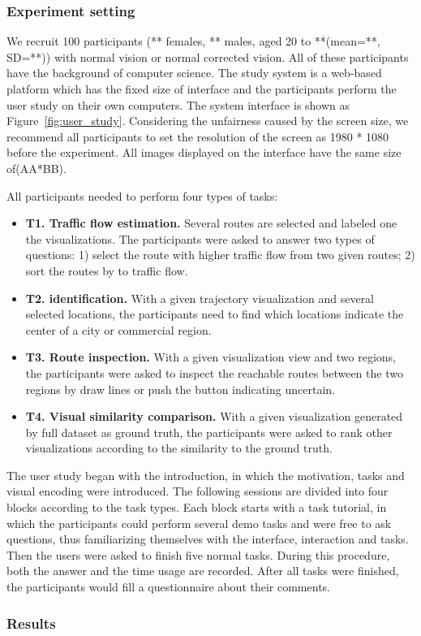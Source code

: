 \subsubsection{Experiment setting}

We recruit 100 participants (** females, ** males, aged 20 to **(mean=**, SD=**)) with normal vision or normal corrected vision. All of these participants have the background of computer science. 
The study system is a web-based platform which has the fixed size of interface and the participants perform the user study on their own  computers.  The system interface is shown as Figure~\ref{fig:user_study}. Considering the unfairness caused by the screen size, we recommend all participants to set the resolution of the screen as 1980 * 1080 before the experiment. All images displayed on the interface have the same size of(AA*BB).  

All participants needed to perform four types of tasks:
\begin{itemize}[noitemsep]
	\item \textbf{T1. Traffic flow estimation.} Several routes are selected and labeled one the visualizations. The participants were asked to answer two types of questions: 1) select the route with higher traffic flow from two given routes; 2) sort the routes by to traffic flow.
	\item \textbf{T2.  identification.} With a given trajectory visualization and several selected locations, the participants need to find which locations indicate the center of a city or commercial region. 
	\item \textbf{T3. Route inspection.} With a given visualization view and two regions, the participants were asked to inspect the reachable routes between the two regions by draw lines or push the button indicating uncertain.
	\item \textbf{T4. Visual similarity comparison.} With a given visualization generated by full dataset as ground truth, the participants were asked to rank other visualizations according to the similarity to the ground truth. 
\end{itemize}

The user study began with the introduction, in which the motivation, tasks and visual encoding were introduced. The following sessions are divided into four blocks according to the task types. Each block starts with a task tutorial, in which the participants could perform several demo tasks and were free to ask questions, thus familiarizing themselves with the interface, interaction and tasks.
Then the users were asked to finish five normal tasks. During this procedure, both the answer and the time usage are recorded.
After all tasks were finished, the participants would fill a questionnaire about their comments. 

\subsubsection{Results}



